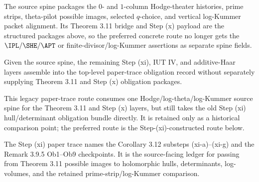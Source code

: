 \begin{definition}
  \label{def:hodge-logtheta-logkummer-spine}
  \leanok
  The source spine packages the \(0\)- and \(1\)-column Hodge-theater histories,
  prime strips, theta-pilot possible images, selected \(q\)-choice, and vertical
  log-Kummer packet alignment.  Its Theorem 3.11 bridge and Step (x) payload
  are the structured packages above, so the preferred concrete route no longer
  gets the \(\IPL/\SHE/\APT\) or finite-divisor/log-Kummer assertions as
  separate spine fields.
\end{definition}

\begin{proposition}
  \label{prop:spine-assembles-source-ledger}
  \leanok
  Given the source spine, the remaining Step (xi), IUT IV, and additive-Haar
  layers assemble into the top-level paper-trace obligation record without
  separately supplying Theorem 3.11 and Step (x) obligation packages.
\end{proposition}

\begin{proposition}
  \label{prop:legacy-source-spine-route-audit}
  \leanok
  This legacy paper-trace route consumes one Hodge/log-theta/log-Kummer source
  spine for the Theorem 3.11 and Step (x) layers, but still takes the old
  Step (xi) hull/determinant obligation bundle directly.  It is retained only
  as a historical comparison point; the preferred route is the
  Step-(xi)-constructed route below.
\end{proposition}

\begin{definition}
  \label{def:step-xi-paper-trace}
  \leanok
  The Step (xi) paper trace names the Corollary 3.12 substeps
  (xi-a)--(xi-g) and the Remark 3.9.5 Ob1--Ob9 checkpoints.  It is the
  source-facing ledger for passing from Theorem 3.11 possible images to
  holomorphic hulls, determinants, log-volumes, and the retained
  prime-strip/log-Kummer comparison.
\end{definition}

